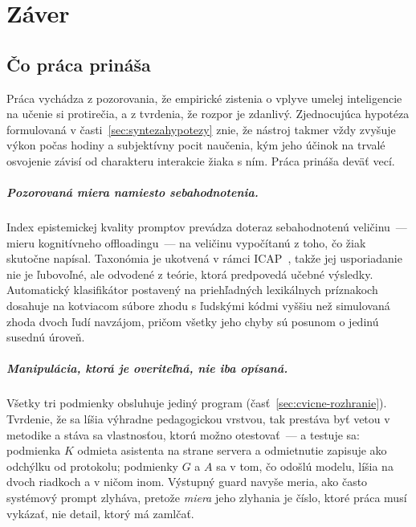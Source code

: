 \chapter{Záver}
\label{chapter:conclusion}

\section{Čo práca prináša}

Práca vychádza z pozorovania, že empirické zistenia o vplyve umelej inteligencie na učenie si protirečia, a z tvrdenia, že rozpor je zdanlivý. Zjednocujúca hypotéza formulovaná v časti~\ref{sec:syntezahypotezy} znie, že nástroj takmer vždy zvyšuje výkon počas hodiny a subjektívny pocit naučenia, kým jeho účinok na trvalé osvojenie závisí od charakteru interakcie žiaka s ním. Práca prináša deväť vecí.

\paragraph{Pozorovaná miera namiesto sebahodnotenia.} Index epistemickej kvality promptov prevádza doteraz sebahodnotenú veličinu~--- mieru kognitívneho offloadingu~--- na veličinu vypočítanú z toho, čo žiak skutočne napísal. Taxonómia je ukotvená v rámci ICAP~\cite{chi2014icap}, takže jej usporiadanie nie je ľubovoľné, ale odvodené z teórie, ktorá predpovedá učebné výsledky. Automatický klasifikátor postavený na priehľadných lexikálnych príznakoch dosahuje na kotviacom súbore zhodu s ľudskými kódmi vyššiu než simulovaná zhoda dvoch ľudí navzájom, pričom všetky jeho chyby sú posunom o jedinú susednú úroveň.

\paragraph{Manipulácia, ktorá je overiteľná, nie iba opísaná.} Všetky tri podmienky obsluhuje jediný program (časť~\ref{sec:cvicne-rozhranie}). Tvrdenie, že sa líšia výhradne pedagogickou vrstvou, tak prestáva byť vetou v metodike a stáva sa vlastnosťou, ktorú možno otestovať~--- a testuje sa: podmienka $K$ odmieta asistenta na strane servera a odmietnutie zapisuje ako odchýlku od protokolu; podmienky $G$ a $A$ sa v tom, čo odošlú modelu, líšia na dvoch riadkoch a v ničom inom. Výstupný guard navyše meria, ako často systémový prompt zlyháva, pretože \emph{miera} jeho zlyhania je číslo, ktoré práca musí vykázať, nie detail, ktorý má zamlčať.


